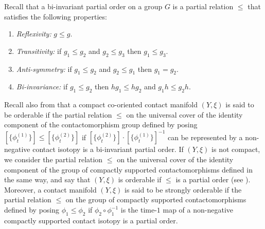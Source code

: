 \documentclass{amsart}
\theoremstyle{remark}
\begin{document}
Recall that a bi-invariant partial order on a group $G$
is a partial relation $\leq$ that satisfies the following properties:
\renewcommand{\theenumi}{\roman{enumi}}
\begin{enumerate}
\item \label{properties po: reflexivity} \emph{Reflexivity:}
$g \leq g$.
\item \label{properties po: transitivity} \emph{Transitivity:}
if $g_1 \leq g_2$ and $g_2 \leq g_3$ then $g_1 \leq g_3$.
\item \label{properties po: anti-symmetry} \emph{Anti-symmetry:}
if $g_1 \leq g_2$ and $g_2 \leq g_1$ then $g_1 = g_2$.
\item \label{properties po: bi-invariance} \emph{Bi-invariance:}
if $g_1 \leq g_2$ then $h g_1 \leq h g_2$ and $g_1 h \leq g_2 h$.
\end{enumerate}

Recall also from \cite{EP}
that a compact co-oriented contact manifold $(Y, \xi)$
is said to be orderable
if the partial relation $\leq$
on the universal cover of the identity component
of the contactomorphism group
defined by posing $[\{\phi_t^{(1)}\}] \leq [\{\phi_t^{(2)}\}]$
if $[\{\phi_t^{(2)}\}] \cdot [\{\phi_t^{(1)}\}]^{-1}$
can be represented by a non-negative contact isotopy
is a bi-invariant partial order.
If $(Y, \xi)$ is not compact,
we consider the partial relation $\leq$
on the universal cover of the identity component
of the group of compactly supported contactomorphisms
defined in the same way,
and say that $(Y, \xi)$ is orderable
if $\leq$ is a partial order
(see \cite{FPR}).
Moreover,
a contact manifold $(Y, \xi)$
is said to be strongly orderable
if the partial relation $\leq$
on the group of compactly supported contactomorphisms
defined by posing $\phi_1 \leq \phi_2$
if $\phi_2 \circ \phi_1^{-1}$
is the time-$1$ map of a non-negative
compactly supported contact isotopy
is a partial order.
\end{document}
